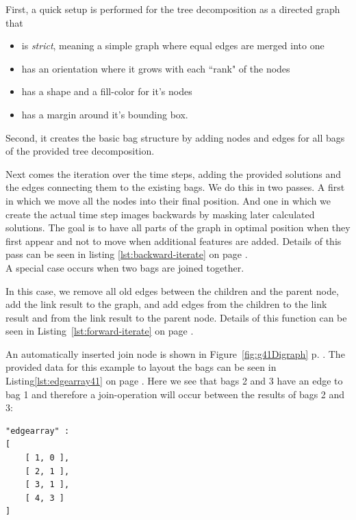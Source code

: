 \documentclass[a4paper, 12pt, bibliography=totoc]{scrartcl}
\begin{document}
First, a quick setup is performed for the tree decomposition as a directed graph that 
\begin{itemize}
	\item is \textit{strict}, meaning a simple graph where equal edges are merged into one
	\item has an orientation where it grows with each ``rank" of the nodes
	\item has a shape and a fill-color for it's nodes
	\item has a margin around it's bounding box.
\end{itemize}

Second, it creates the basic bag structure by adding nodes and edges for all bags of the provided tree decomposition.

Next comes the iteration over the time steps, adding the provided solutions and the edges connecting them to the existing bags. We do this in two passes.  A first in which we move all the nodes into their final position. And one in which we create the actual time step images backwards by masking later calculated solutions. The goal is to have all parts of the graph in optimal position when they first appear and not to move when additional features are added. Details of this pass can be seen in listing \ref{lst:backward-iterate} on page \pageref{lst:backward-iterate}.\\

A special case occurs when two bags are joined together.

In this case, we remove all old edges between the children and the parent node, add the link result to the graph, and add edges from the children to the link result and from the link result to the parent node. Details of this function can be seen in Listing~\ref{lst:forward-iterate} on page \pageref{lst:forward-iterate}.

An automatically inserted join node is shown in Figure~\ref{fig:g41Digraph} p. \pageref{fig:g41Digraph}.
The provided data for this example to layout the bags can be seen in Listing\ref{lst:edgearray41} on page \pageref{lst:edgearray41}. Here we see that bags 2 and 3 have an edge to bag 1 and therefore a join-operation will occur between the results of bags 2 and 3:

\begin{lstlisting}[caption={Structure provided for bags of example \ref{fig:g41Digraph} },label={lst:edgearray41},numbers=none,backgroundcolor=\color{white}]
"edgearray" : 
[
	[ 1, 0 ],
	[ 2, 1 ],
	[ 3, 1 ],
	[ 4, 3 ]
]
\end{lstlisting}
\end{document}
